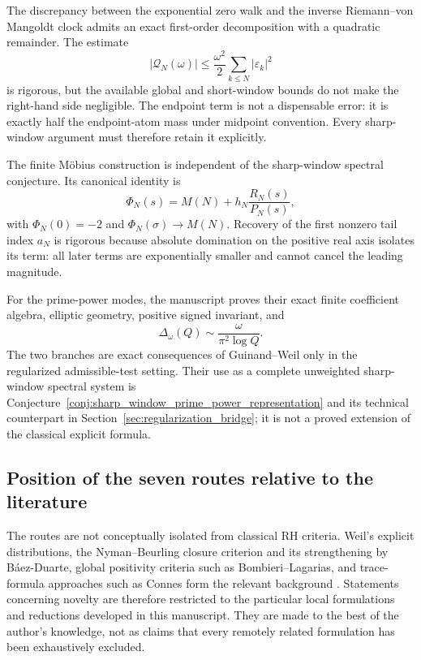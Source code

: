 \documentclass[11pt]{amsart}
\numberwithin{equation}{section}
\theoremstyle{plain}
\theoremstyle{definition}
\theoremstyle{remark}
\newcommand{\1}{\mathbf{1}}
\begin{document}
The discrepancy between the exponential zero walk and the inverse
Riemann--von Mangoldt clock admits an exact first-order decomposition with a
quadratic remainder. The estimate
\begin{equation}
|\mathcal Q_N(\omega)|
\leq
\frac{\omega^2}{2}\sum_{k\leq N}|\varepsilon_k|^2
\label{eq:conclusion_phase_remainder}
\end{equation}
is rigorous, but the available global and short-window bounds do not make the
right-hand side negligible. The endpoint term is not a dispensable error: it
is exactly half the endpoint-atom mass under midpoint convention. Every
sharp-window argument must therefore retain it explicitly.

The finite Möbius construction is independent of the sharp-window spectral
conjecture. Its canonical identity is
\begin{equation}
\Phi_N(s)=M(N)+h_N\frac{R_N(s)}{P_N(s)},
\label{eq:conclusion_Phi}
\end{equation}
with $\Phi_N(0)=-2$ and $\Phi_N(\sigma)\to M(N)$. Recovery of the first
nonzero tail index $a_N$ is rigorous because absolute domination on the
positive real axis isolates its term: all later terms are exponentially
smaller and cannot cancel the leading magnitude.

For the prime-power modes, the manuscript proves their exact finite
coefficient algebra, elliptic geometry, positive signed invariant, and
\begin{equation}
\Delta_\omega(Q)\sim\frac{\omega}{\pi^2\log Q}.
\label{eq:conclusion_Delta}
\end{equation}
The two branches are exact consequences of Guinand--Weil only in the
regularized admissible-test setting. Their use as a complete unweighted
sharp-window spectral system is Conjecture~\ref{conj:sharp_window_prime_power_representation} and its
technical counterpart in Section~\ref{sec:regularization_bridge}; it is not a
proved extension of the classical explicit formula.

\subsection{Position of the seven routes relative to the literature}
\label{subsec:conclusion_literature}

The routes are not conceptually isolated from classical RH criteria. Weil's
explicit distributions, the Nyman--Beurling closure criterion and its
strengthening by Báez-Duarte, global positivity criteria such as
Bombieri--Lagarias, and trace-formula approaches such as Connes form the
relevant background
\cite{Weil1952,Nyman1950,Beurling1955,BaezDuarte2003,
BombieriLagarias1999,Connes1999}. Statements concerning novelty are therefore
restricted to the particular local formulations and reductions developed in
this manuscript. They are made to the best of the author's knowledge, not as
claims that every remotely related formulation has been exhaustively
excluded.
\end{document}

